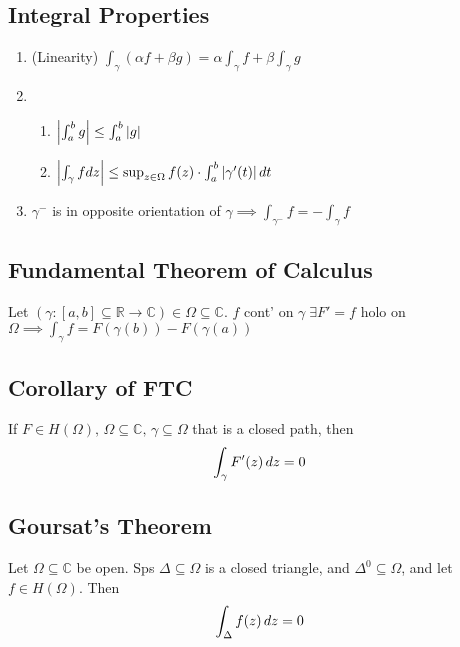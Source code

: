 \subsection{Integral Properties} %
\label{sub:integral_properties}
\begin{enumerate}
	\item (Linearity) $\int_{\gamma} (\alpha f + \beta g) = \alpha \int_{\gamma} f + \beta \int_{\gamma} g$
	\item \begin{enumerate}
		\item $\left|\int_{a}^{b} g\right| \leq \int_{a}^{b} \left|g\right|$
		\item $\left|\int_{\gamma} f dz\right| \leq \sup_{z \in \Omega} f(z) \cdot \int_{a}^{b} \left|\gamma'(t)\right| dt$
	\end{enumerate}
	\item $\gamma^-$ is in opposite orientation of $\gamma \implies \int_{\gamma^-} f = - \int_{\gamma} f$
\end{enumerate}

\subsection{Fundamental Theorem of Calculus} %
\label{sub:fundamental_theorem_of_calculus}
Let $(\gamma : [a, b] \subseteq \mathbb{R} \to \mathbb{C}) \in \Omega \subseteq \mathbb{C}$. $f$ cont' on $\gamma \; \exists F' = f$ holo on $\Omega \implies \int_{\gamma} f = F(\gamma(b)) - F(\gamma(a))$

\subsection{Corollary of FTC} %
\label{sub:corollary_of_ftc}
If $F \in H(\Omega), \, \Omega \subseteq \mathbb{C}, \, \gamma \subseteq \Omega$ that is a closed path, then
\begin{equation*}
	\int_{\gamma} F'(z) \mathop{}\!d{z} = 0
\end{equation*}

\subsection{Goursat's Theorem} %
\label{sub:goursat_s_theorem}
Let $\Omega \subseteq \mathbb{C}$ be open. Sps $\Delta \subseteq \Omega$ is a closed triangle, and $\Delta^0 \subseteq \Omega$, and let $f \in H(\Omega)$. Then
\begin{equation*}
	\int_{\Delta} f(z) \mathop{}\!d{z} = 0
\end{equation*}

